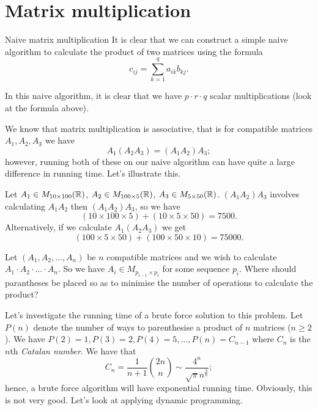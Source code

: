 \section{Matrix multiplication}

\begin{algorithm}
    Naive matrix multiplication
    It is clear that we can construct a simple naive algorithm to calculate the product of two matrices using the formula
    \[ c_{ij} = \sum_{k = 1}^{q} a_{ik}b_{kj}. \]
\end{algorithm}

In this naive algorithm, 
it is clear that we have $p \cdot r \cdot q$ scalar multiplications 
(look at the formula above).

We know that matrix multiplication is associative, 
that is for compatible matrices $A_1, A_2, A_3$ we have
\[ A_1(A_2 A_3) = (A_1A_2)A_3; \]
however, running both of these on our naive algorithm can have quite a large difference in running time. 
Let's illustrate this.

\begin{example}
    Let $A_1 \in M_{10 \times 100}(\mathbb{R})$, $A_2 \in M_{100 \times 5}(\mathbb{R})$, $A_3 \in M_{5 \times 50}(\mathbb{R})$. $(A_1A_2)A_3$ involves calculating $A_1A_2$ then $(A_1A_2)A_3$, so we have
    \[ (10 \times 100 \times 5) + (10 \times 5 \times 50) = 7500. \]
    Alternatively, if we calculate $A_1(A_2A_3)$ we get
    \[ (100 \times 5 \times 50) + (100 \times 50 \times 10) = 75000. \]
\end{example}

\begin{problem}
    Let $(A_1, A_2, \ldots, A_n)$ be $n$ compatible matrices and we wish to calculate $A_1 \cdot A_2 \cdot \ldots \cdot A_n$. 
    So we have $A_i \in M_{p_{i - 1} \times p_i}$ for some sequence $p_i$. 
    Where should parantheses be placed so as to minimise the number of operations to calculate the product?
\end{problem}

Let's investigate the running time of a brute force solution to this problem. 
Let $P(n)$ denote the number of ways to parenthesise a product of $n$ matrices ($n \geq 2$). 
We have $P(2) = 1, P(3) = 2, P(4) = 5, \ldots, P(n) = C_{n - 1}$ 
where $C_n$ is the $n$th \emph{Catalan number}. 
We have that
\[ C_n = \frac1{n + 1} \binom{2n}{n} \sim \frac{4^n}{\sqrt{\pi} n^{\frac3n}};  \]
hence, 
a brute force algorithm will have exponential running time. 
Obviously, this is not very good. 
Let's look at applying dynamic programming.

